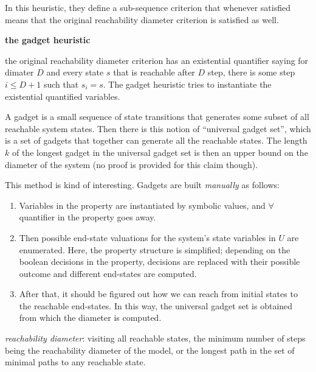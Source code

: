 In this heuristic, they define a sub-sequence criterion that whenever satisfied means that the original reachability diameter criterion is satisfied as well.

\textbf{the gadget heuristic}

the original reachability diameter criterion has an existential quantifier saying for dimater $D$ and
 every state $s$ that is reachable after $D$ step, there is some step $i \le D + 1$ such 
 that $s_i = s$. The gadget heuristic tries to instantiate the existential quantified variables. 
 
 A gadget is a small sequence of state transitions that generates some subset of all reachable
system states. Then there is this notion of ``universal gadget set'', which is a set of gadgets that together can generate all the reachable states. 
The
length
$k$
of  the  longest  gadget  in  the  universal  gadget  set  is
then an upper bound on the diameter of the system (no proof is provided for this claim though).

This method is kind of interesting. Gadgets are built \textit{manually} as follows:

\begin{enumerate}
  \item Variables in the property are instantiated by symbolic values, and $\forall$ quantifier in the 
  property goes away. 
  \item Then  possible  end-state  valuations
for the system’s state variables in $U$ are enumerated. Here, the property structure is simplified; depending on the boolean decisions in the property, decisions are replaced with their possible outcome and
different end-states are computed. 
\item After that, it should be figured out how we can reach from initial states to the reachable end-states. In this way, the universal gadget set is obtained from which the diameter is computed.
\end{enumerate}

\linebreak
\linebreak


\emph{reachability diameter}: visiting all
reachable states, the minimum number of steps being the
reachability diameter
of the
model, or the longest path in the set of minimal paths to any reachable state.


